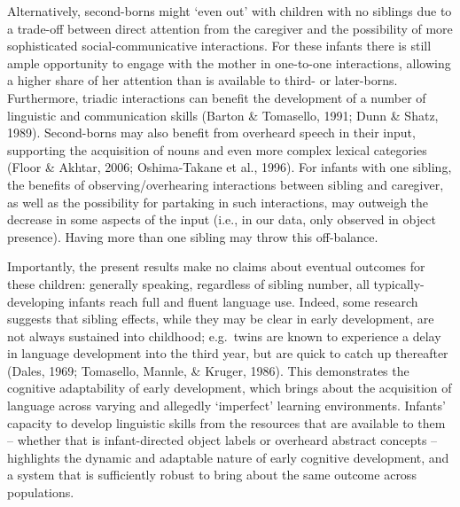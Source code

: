 \documentclass[
  english,
  man,floatsintext]{apa6}
\begin{document}
Alternatively, second-borns might `even out' with children with no siblings due to a trade-off between direct attention from the caregiver and the possibility of more sophisticated social-communicative interactions. For these infants there is still ample opportunity to engage with the mother in one-to-one interactions, allowing a higher share of her attention than is available to third- or later-borns. Furthermore, triadic interactions can benefit the development of a number of linguistic and communication skills (Barton \& Tomasello, 1991; Dunn \& Shatz, 1989). Second-borns may also benefit from overheard speech in their input, supporting the acquisition of nouns and even more complex lexical categories (Floor \& Akhtar, 2006; Oshima-Takane et al., 1996). For infants with one sibling, the benefits of observing/overhearing interactions between sibling and caregiver, as well as the possibility for partaking in such interactions, may outweigh the decrease in some aspects of the input (i.e., in our data, only observed in object presence). Having more than one sibling may throw this off-balance.

Importantly, the present results make no claims about eventual outcomes for these children: generally speaking, regardless of sibling number, all typically-developing infants reach full and fluent language use. Indeed, some research suggests that sibling effects, while they may be clear in early development, are not always sustained into childhood; e.g.~twins are known to experience a delay in language development into the third year, but are quick to catch up thereafter (Dales, 1969; Tomasello, Mannle, \& Kruger, 1986). This demonstrates the cognitive adaptability of early development, which brings about the acquisition of language across varying and allegedly `imperfect' learning environments. Infants' capacity to develop linguistic skills from the resources that are available to them -- whether that is infant-directed object labels or overheard abstract concepts -- highlights the dynamic and adaptable nature of early cognitive development, and a system that is sufficiently robust to bring about the same outcome across populations.
\end{document}
